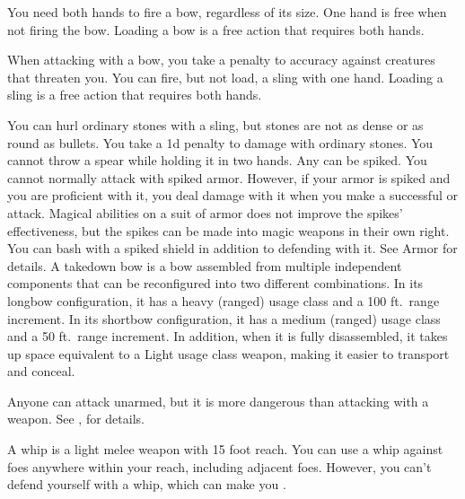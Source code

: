          You need both hands to fire a bow, regardless of its size. One hand is free when not firing the bow. Loading a bow is a free action that requires both hands.
        \par When attacking with a bow, you take a  penalty to accuracy against creatures that threaten you.
         You can fire, but not load, a sling with one hand. Loading a sling is a free action that requires both hands.
        \par You can hurl ordinary stones with a sling, but stones are not as dense or as round as bullets. You take a \minus1d penalty to damage with ordinary stones.
         You cannot throw a spear while holding it in two hands.
         Any  can be spiked.
        You cannot normally attack with spiked armor.
        However, if your armor is spiked and you are proficient with it, you deal damage with it when you make a successful  or  attack.
        Magical abilities on a suit of armor does not improve the spikes' effectiveness, but the spikes can be made into magic weapons in their own right.
         You can bash with a spiked shield in addition to defending with it. See Armor for details.
         A takedown bow is a bow assembled from multiple independent components that can be reconfigured into two different combinations.
        In its longbow configuration, it has a heavy (ranged) usage class and a 100 ft.\ range increment.
        In its shortbow configuration, it has a medium (ranged) usage class and a 50 ft.\ range increment.
        In addition, when it is fully disassembled, it takes up space equivalent to a Light usage class weapon, making it easier to transport and conceal.

         Anyone can attack unarmed, but it is more dangerous than attacking with a weapon. See , for details.

         A whip is a light melee weapon with 15 foot reach.
        You can use a whip against foes anywhere within your reach, including adjacent foes.
        However, you can't defend yourself with a whip, which can make you .

